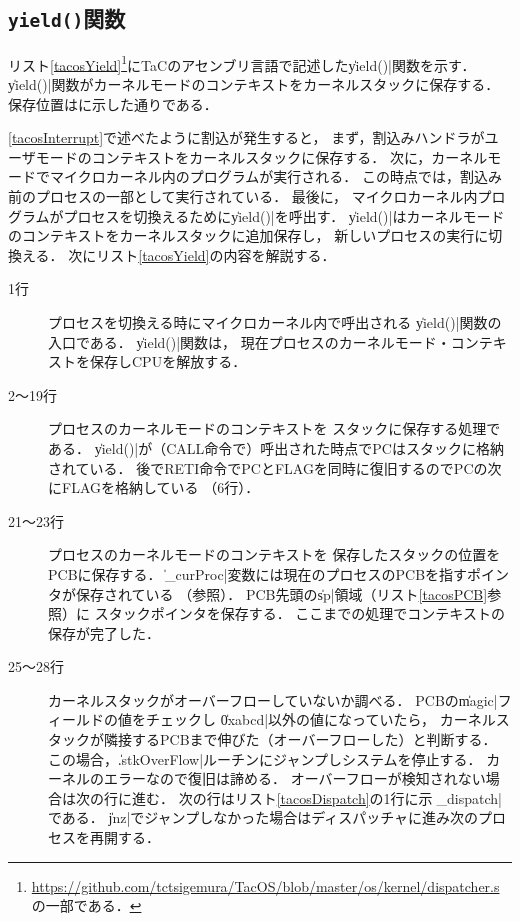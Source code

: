 \subsection{\texttt{yield()}関数}
リスト\ref{tacosYield}\footnote{
  \url{https://github.com/tctsigemura/TacOS/blob/master/os/kernel/dispatcher.s}
  の一部である．
}にTaCのアセンブリ言語で記述した\|yield()|関数を示す．
\|yield()|関数がカーネルモードのコンテキストをカーネルスタックに保存する．
保存位置はに示した通りである．

\ref{tacosInterrupt}で述べたように割込が発生すると，
まず，割込みハンドラがユーザモードのコンテキストをカーネルスタックに保存する．
次に，カーネルモードでマイクロカーネル内のプログラムが実行される．
この時点では，割込み前のプロセスの一部として実行されている．
最後に，
マイクロカーネル内プログラムがプロセスを切換えるために\|yield()|を呼出す．
\|yield()|はカーネルモードのコンテキストをカーネルスタックに追加保存し，
新しいプロセスの実行に切換える．
次にリスト\ref{tacosYield}の内容を解説する．



\begin{description}
\item[1行] プロセスを切換える時にマイクロカーネル内で呼出される
  \|yield()|関数の入口である．
  \|yield()|関数は，
  現在プロセスのカーネルモード・コンテキストを保存しCPUを解放する．
\item[2〜19行] プロセスのカーネルモードのコンテキストを
  スタックに保存する処理である．
  \|yield()|が（CALL命令で）呼出された時点でPCはスタックに格納されている．
  後でRETI命令でPCとFLAGを同時に復旧するのでPCの次にFLAGを格納している
  （6行）．
\item[21〜23行] プロセスのカーネルモードのコンテキストを
  保存したスタックの位置をPCBに保存する．
  \|_curProc|変数には現在のプロセスのPCBを指すポインタが保存されている
  （参照）．
  PCB先頭の\|sp|領域（リスト\ref{tacosPCB}参照）に
  スタックポインタを保存する．
  ここまでの処理でコンテキストの保存が完了した．
\item[25〜28行] カーネルスタックがオーバーフローしていないか調べる．
  PCBの\|magic|フィールドの値をチェックし
  \|0xabcd|以外の値になっていたら，
  カーネルスタックが隣接するPCBまで伸びた（オーバーフローした）と判断する．
  この場合，\|.stkOverFlow|ルーチンにジャンプしシステムを停止する．
  カーネルのエラーなので復旧は諦める．
  オーバーフローが検知されない場合は次の行に進む．
  次の行はリスト\ref{tacosDispatch}の1行に示す\|_dispatch|である．
  \|jnz|でジャンプしなかった場合はディスパッチャに進み次のプロセスを再開する．
\end{description}

